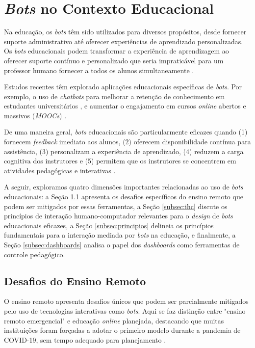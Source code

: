 \section{\textit{Bots} no Contexto Educacional} \label{sec:bots-educ}

Na educação, os \textit{bots} têm sido utilizados para diversos propósitos,
desde fornecer suporte administrativo até oferecer experiências de aprendizado
personalizadas. Os \textit{bots} educacionais podem transformar a experiência de
aprendizagem ao oferecer suporte contínuo e personalizado que seria impraticável
para um professor humano fornecer a todos os alunos simultaneamente
\cite{zawacki2019}.

Estudos recentes têm explorado aplicações educacionais específicas de
\textit{bots}. Por exemplo, o uso de \textit{chatbots} para melhorar a retenção
de conhecimento em estudantes universitários \cite{okonkwo2021}, e aumentar o
engajamento em cursos \textit{online} abertos e massivos (\textit{MOOCs})
\cite{han2022}.

De uma maneira geral, \textit{bots} educacionais são particularmente eficazes
quando (1) fornecem \textit{feedback} imediato aos alunos, (2) oferecem
disponibilidade contínua para assistência, (3) personalizam a experiência de
aprendizado, (4) reduzem a carga cognitiva dos instrutores e (5) permitem que os
instrutores se concentrem em atividades pedagógicas e interativas
\cite{silva2024}.

A seguir, exploramos quatro dimensões importantes relacionadas ao uso de
\textit{bots} educacionais: a Seção \ref{subsec:desafios} apresenta os desafios
específicos do ensino remoto que podem ser mitigados por essas ferramentas, a
Seção \ref{subsec:ihc} discute os princípios de interação humano-computador
relevantes para o \textit{design} de \textit{bots} educacionais eficazes, a
Seção \ref{subsec:principios} delineia os princípios fundamentais para a
interação mediada por \textit{bots} na educação, e finalmente, a Seção
\ref{subsec:dashboards} analisa o papel dos \textit{dashboards} como ferramentas
de controle pedagógico.

\subsection{Desafios do Ensino Remoto} \label{subsec:desafios}

O ensino remoto apresenta desafios únicos que podem ser parcialmente mitigados
pelo uso de tecnologias interativas como \textit{bots}. Aqui se faz distinção entre
"ensino remoto emergencial" e educação \textit{online} planejada, destacando que
muitas instituições foram forçadas a adotar o primeiro modelo durante a pandemia
de COVID-19, sem tempo adequado para planejamento
\cite{hodges2020}\cite{fabiane2024}.

